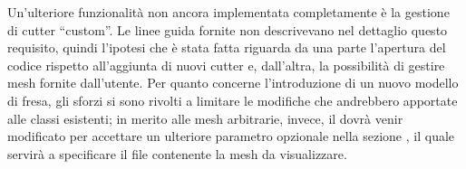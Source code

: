 Un'ulteriore funzionalità non ancora implementata completamente è la gestione di cutter ``custom''. Le linee guida fornite non descrivevano nel dettaglio questo requisito, quindi l'ipotesi che è stata fatta riguarda da una parte l'apertura del codice rispetto all'aggiunta di nuovi cutter e, dall'altra, la possibilità di gestire mesh fornite dall'utente. Per quanto concerne l'introduzione di un nuovo modello di fresa, gli sforzi si sono rivolti a limitare le modifiche che andrebbero apportate alle classi esistenti; in merito alle mesh arbitrarie, invece, il  dovrà venir modificato per accettare un ulteriore parametro opzionale nella sezione \code{[TOOL]}, il quale servirà a specificare il file contenente la mesh da visualizzare.
